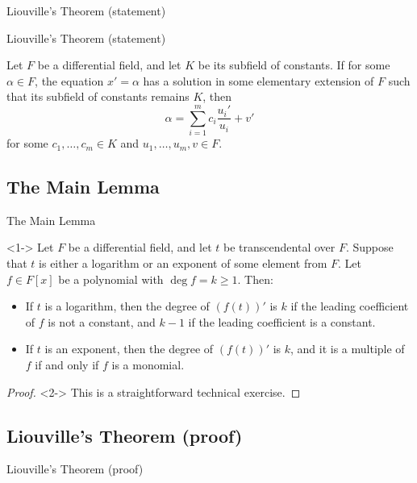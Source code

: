 \documentclass[8pt]{beamer}
\renewcommand{\|}{\ensuremath{\hspace{0.1cm} | \hspace{0.1cm}}}
\begin{document}
    \begin{section}{Liouville's Theorem (statement)}
    \begin{frame}{Liouville's Theorem (statement)}
        \begin{theorem}[Liouville, 1833–1841]
            Let $F$ be a differential field, and let $K$ be its subfield of constants.  
            If for some $\alpha \in F$, the equation $x' = \alpha$ has a solution in some elementary extension of $F$ such that its subfield of constants remains $K$, then  
            \[
                \alpha = \sum\limits_{i=1}^m c_i \frac{u_i'}{u_i} + v'
            \]
            for some $c_1, \ldots, c_m \in K$ and $u_1, \ldots, u_m, v \in F$.
        \end{theorem}
    \end{frame}

    \section{The Main Lemma}
    \begin{frame}{The Main Lemma}
        \begin{lemma}<1->
            Let $F$ be a differential field, and let $t$ be transcendental over $F$. Suppose that $t$ is either a logarithm or an exponent of some element from $F$.  
            Let $f \in F[x]$ be a polynomial with $\deg f = k \geq 1$. Then:
            \begin{itemize}
                \item If $t$ is a logarithm, then the degree of $(f(t))'$ is $k$ if the leading coefficient of $f$ is not a constant, and $k - 1$ if the leading coefficient is a constant.
                \item If $t$ is an exponent, then the degree of $(f(t))'$ is $k$, and it is a multiple of $f$ if and only if $f$ is a monomial.
            \end{itemize}
        \end{lemma}

        \begin{proof}<2->
            This is a straightforward technical exercise.
        \end{proof}
    \end{frame}

    \section{Liouville's Theorem (proof)}
    \begin{frame}{Liouville's Theorem (proof)}
\end{frame}
\end{section}
\end{document}
